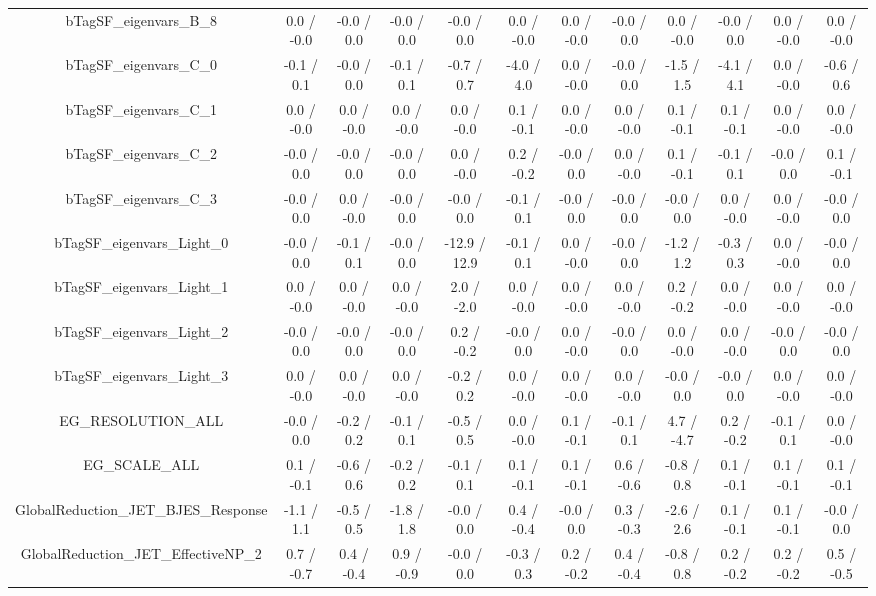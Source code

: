 \begin{table}[htbp]
\begin{center}
\begin{tabular}{|c|c|c|c|c|c|c|c|c|c|c|c|}
  bTagSF_eigenvars_B_8 & 0.0 / -0.0 & -0.0 / 0.0 & -0.0 / 0.0 & -0.0 / 0.0 & 0.0 / -0.0 & 0.0 / -0.0 & -0.0 / 0.0 & 0.0 / -0.0 & -0.0 / 0.0 & 0.0 / -0.0 & 0.0 / -0.0 \\ 
  bTagSF_eigenvars_C_0 & -0.1 / 0.1 & -0.0 / 0.0 & -0.1 / 0.1 & -0.7 / 0.7 & -4.0 / 4.0 & 0.0 / -0.0 & -0.0 / 0.0 & -1.5 / 1.5 & -4.1 / 4.1 & 0.0 / -0.0 & -0.6 / 0.6 \\ 
  bTagSF_eigenvars_C_1 & 0.0 / -0.0 & 0.0 / -0.0 & 0.0 / -0.0 & 0.0 / -0.0 & 0.1 / -0.1 & 0.0 / -0.0 & 0.0 / -0.0 & 0.1 / -0.1 & 0.1 / -0.1 & 0.0 / -0.0 & 0.0 / -0.0 \\ 
  bTagSF_eigenvars_C_2 & -0.0 / 0.0 & -0.0 / 0.0 & -0.0 / 0.0 & 0.0 / -0.0 & 0.2 / -0.2 & -0.0 / 0.0 & 0.0 / -0.0 & 0.1 / -0.1 & -0.1 / 0.1 & -0.0 / 0.0 & 0.1 / -0.1 \\ 
  bTagSF_eigenvars_C_3 & -0.0 / 0.0 & 0.0 / -0.0 & -0.0 / 0.0 & -0.0 / 0.0 & -0.1 / 0.1 & -0.0 / 0.0 & -0.0 / 0.0 & -0.0 / 0.0 & 0.0 / -0.0 & 0.0 / -0.0 & -0.0 / 0.0 \\ 
  bTagSF_eigenvars_Light_0 & -0.0 / 0.0 & -0.1 / 0.1 & -0.0 / 0.0 & -12.9 / 12.9 & -0.1 / 0.1 & 0.0 / -0.0 & -0.0 / 0.0 & -1.2 / 1.2 & -0.3 / 0.3 & 0.0 / -0.0 & -0.0 / 0.0 \\ 
  bTagSF_eigenvars_Light_1 & 0.0 / -0.0 & 0.0 / -0.0 & 0.0 / -0.0 & 2.0 / -2.0 & 0.0 / -0.0 & 0.0 / -0.0 & 0.0 / -0.0 & 0.2 / -0.2 & 0.0 / -0.0 & 0.0 / -0.0 & 0.0 / -0.0 \\ 
  bTagSF_eigenvars_Light_2 & -0.0 / 0.0 & -0.0 / 0.0 & -0.0 / 0.0 & 0.2 / -0.2 & -0.0 / 0.0 & 0.0 / -0.0 & -0.0 / 0.0 & 0.0 / -0.0 & 0.0 / -0.0 & -0.0 / 0.0 & -0.0 / 0.0 \\ 
  bTagSF_eigenvars_Light_3 & 0.0 / -0.0 & 0.0 / -0.0 & 0.0 / -0.0 & -0.2 / 0.2 & 0.0 / -0.0 & 0.0 / -0.0 & 0.0 / -0.0 & -0.0 / 0.0 & -0.0 / 0.0 & 0.0 / -0.0 & 0.0 / -0.0 \\ 
  EG_RESOLUTION_ALL & -0.0 / 0.0 & -0.2 / 0.2 & -0.1 / 0.1 & -0.5 / 0.5 & 0.0 / -0.0 & 0.1 / -0.1 & -0.1 / 0.1 & 4.7 / -4.7 & 0.2 / -0.2 & -0.1 / 0.1 & 0.0 / -0.0 \\ 
  EG_SCALE_ALL & 0.1 / -0.1 & -0.6 / 0.6 & -0.2 / 0.2 & -0.1 / 0.1 & 0.1 / -0.1 & 0.1 / -0.1 & 0.6 / -0.6 & -0.8 / 0.8 & 0.1 / -0.1 & 0.1 / -0.1 & 0.1 / -0.1 \\ 
  GlobalReduction_JET_BJES_Response & -1.1 / 1.1 & -0.5 / 0.5 & -1.8 / 1.8 & -0.0 / 0.0 & 0.4 / -0.4 & -0.0 / 0.0 & 0.3 / -0.3 & -2.6 / 2.6 & 0.1 / -0.1 & 0.1 / -0.1 & -0.0 / 0.0 \\ 
  GlobalReduction_JET_EffectiveNP_2 & 0.7 / -0.7 & 0.4 / -0.4 & 0.9 / -0.9 & -0.0 / 0.0 & -0.3 / 0.3 & 0.2 / -0.2 & 0.4 / -0.4 & -0.8 / 0.8 & 0.2 / -0.2 & 0.2 / -0.2 & 0.5 / -0.5 \\ 

\end{tabular}
\end{center}
\end{table}
